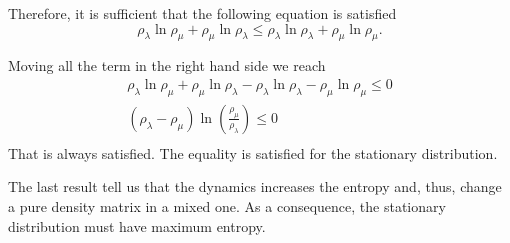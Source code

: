 Therefore, it is sufficient that the following equation is satisfied
\begin{equation}
    \rho_\lambda\ln\rho_\mu + \rho_\mu\ln\rho_\lambda\leq \rho_\lambda\ln\rho_\lambda+ \rho_\mu\ln\rho_\mu.
\end{equation}

Moving all the term in the right hand side we reach
\begin{equation}
    \begin{split}
        \rho_\lambda\ln\rho_\mu + \rho_\mu\ln\rho_\lambda - \rho_\lambda\ln\rho_\lambda- \rho_\mu\ln\rho_\mu \leq 0\\
        \left(\rho_\lambda-\rho_\mu\right)\ln\left(\frac{\rho_\mu}{\rho_\lambda}\right) \leq0\\
    \end{split}
\end{equation}
That is always satisfied. The equality is satisfied for the stationary distribution.

The last result tell us that the dynamics increases the entropy and, thus, change a pure density matrix in a mixed one.
As a consequence, the stationary distribution must have maximum entropy.